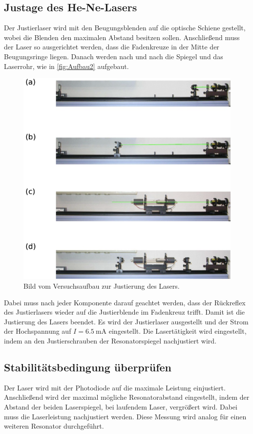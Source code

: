 \subsection{Justage des He-Ne-Lasers}
\label{subsec:Justage}
Der Justierlaser wird mit den Beugungsblenden auf die optische Schiene gestellt, wobei die Blenden den maximalen Abstand besitzen sollen.
Anschließend muss der Laser so ausgerichtet werden, dass die Fadenkreuze in der Mitte der Beugungsringe liegen.
Danach werden nach und nach die Spiegel und das Laserrohr, wie in \autoref{fig:Aufbau2} aufgebaut.
\begin{figure}[H]
    \centering
    \includegraphics[scale=0.7]{Abbildungen/Aufbau2.png}
    \caption{Bild vom Versuchsaufbau zur Justierung des Lasers.\cite{V61}}
    \label{fig:Aufbau2}
\end{figure}
Dabei muss nach jeder Komponente darauf geachtet werden, dass der Rückreflex des Justierlasers wieder auf die Justierblende im Fadenkreuz trifft.
Damit ist die Justierung des Lasers beendet. Es wird der Justierlaser ausgestellt und der Strom der Hochspannung
auf $I = \qty{6.5}{\milli\A}$ eingestellt. Die Lasertätigkeit wird eingestellt, indem an den Justierschrauben der Resonatorspiegel nachjustiert wird.

\subsection{Stabilitätsbedingung überprüfen}
\label{subsec:Stabilitätsbedingung}
Der Laser wird mit der Photodiode auf die maximale Leistung einjustiert.
Anschließend wird der maximal mögliche Resonatorabstand eingestellt, indem der Abstand der beiden Laserspiegel, bei laufendem Laser, vergrößert wird.
Dabei muss die Laserleistung nachjustiert werden.
Diese Messung wird analog für einen weiteren Resonator durchgeführt.

